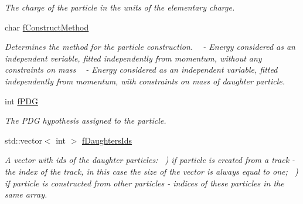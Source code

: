 \begin{DoxyCompactItemize}
\begin{DoxyCompactList}\small\item\em The charge of the particle in the units of the elementary charge. \end{DoxyCompactList}\item 
char \hyperlink{classKFParticleBase_a6cc71ce0845697b3427db70690a509d9}{f\+Construct\+Method}\hypertarget{classKFParticleBase_a6cc71ce0845697b3427db70690a509d9}{}\label{classKFParticleBase_a6cc71ce0845697b3427db70690a509d9}

\begin{DoxyCompactList}\small\item\em Determines the method for the particle construction. ~ -\/ Energy considered as an independent veriable, fitted independently from momentum, without any constraints on mass ~ -\/ Energy considered as an independent variable, fitted independently from momentum, with constraints on mass of daughter particle. \end{DoxyCompactList}\item 
int \hyperlink{classKFParticleBase_ae5627ec0a06abfd66387caa7b349c0a4}{f\+P\+DG}\hypertarget{classKFParticleBase_ae5627ec0a06abfd66387caa7b349c0a4}{}\label{classKFParticleBase_ae5627ec0a06abfd66387caa7b349c0a4}

\begin{DoxyCompactList}\small\item\em The P\+DG hypothesis assigned to the particle. \end{DoxyCompactList}\item 
std\+::vector$<$ int $>$ \hyperlink{classKFParticleBase_aa6a792e88545404d791796ba32fa1515}{f\+Daughters\+Ids}\hypertarget{classKFParticleBase_aa6a792e88545404d791796ba32fa1515}{}\label{classKFParticleBase_aa6a792e88545404d791796ba32fa1515}

\begin{DoxyCompactList}\small\item\em A vector with ids of the daughter particles\+: ~) if particle is created from a track -\/ the index of the track, in this case the size of the vector is always equal to one; ~) if particle is constructed from other particles -\/ indices of these particles in the same array. \end{DoxyCompactList}\end{DoxyCompactItemize}


